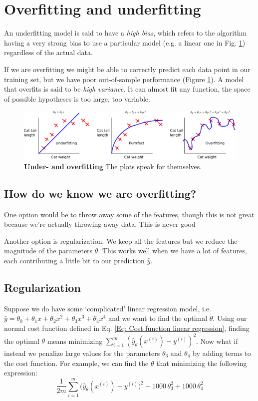\documentclass[a4paper, 10pt,hidelinks]{article}
\newcommand{\ind}[1]{^{(#1)}}
\begin{document}
\section{Overfitting and underfitting}

An underfitting model is said to have a \emph{high bias}, which refers to the algorithm having a very strong bias to use a particular model (e.g. a linear one in Fig. \ref{Fig: UnderOver}) regardless of the actual data. 

If we are overfitting we might be able to correctly predict each data point in our training set, but we have poor out-of-sample performance (Figure \ref{Fig: UnderOver}). A model that overfits is said to be \emph{high variance}. It can almost fit any function, the space of possible hypotheses is too large, too variable. 


\begin{figure}[h!]
\includegraphics[width=0.9\linewidth]{UnderOver}
\caption{\footnotesize{\textbf{Under- and overfitting} The plots speak for themselves.}}
\label{Fig: UnderOver}
\end{figure}

\subsection{How do we know we are overfitting?}

One option would be to throw away some of the features, though this is not great because we're actually throwing away data. This is never good

Another option is regularization. We keep all the features but we reduce the magnitude of the parameters $\theta$. This works well when we have a lot of features, each contributing a little bit to our prediction $\hat{y}$.

\subsection{Regularization}

Suppose we do have some `complicated' linear regression model, i.e. $\hat{y} = \theta_0 + \theta_1 x + \theta_2 x^2 + \theta_3 x^3 + \theta_4 x^4$ and we want to find the optimal $\theta$. Using our normal cost function defined in Eq. \eqref{Eq: Cost function linear regression}, finding the optimal $\theta$ means minimizing $\sum_{i = 1}^m (\hat{y}_{\theta}(x\ind{i}) - y\ind{i})^2$. Now what if instead we penalize large values for the parameters $\theta_3$ and $\theta_4$ by adding terms to the cost function. For example, we can find the $\theta$ that minimizing the following expression:
\begin{equation}
\frac{1}{2m} \sum_{i = 1}^m \Big(\hat{y}_{\theta}(x\ind{i}) - y\ind{i}\Big)^2 + 1000 \, \theta_3^2 + 1000 \,\theta_4^2
\end{equation}
\end{document}
